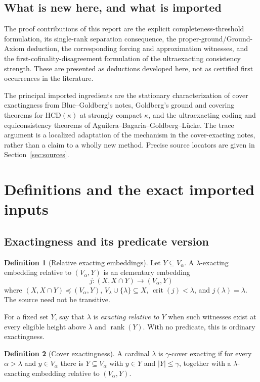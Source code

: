 \documentclass[11pt,letterpaper]{article}
\theoremstyle{definition}
\newtheorem{definition}{Definition}[section]
\newcommand{\crit}{\operatorname{crit}}
\newcommand{\rank}{\operatorname{rank}}
\newcommand{\HCD}{\mathrm{HCD}}
\begin{document}
\subsection{What is new here, and what is imported}

The proof contributions of this report are the explicit completeness-threshold formulation, its single-rank separation consequence, the proper-ground/Ground-Axiom deduction, the corresponding forcing and approximation witnesses, and the first-cofinality-disagreement formulation of the ultraexacting consistency strength. These are presented as deductions developed here, not as certified first occurrences in the literature.

The principal imported ingredients are the stationary characterization of cover exactingness from Blue--Goldberg's notes, Goldberg's ground and covering theorems for $\HCD(\kappa)$ at strongly compact $\kappa$, and the ultraexacting coding and equiconsistency theorems of Aguilera--Bagaria--Goldberg--L\"ucke. The trace argument is a localized adaptation of the mechanism in the cover-exacting notes, rather than a claim to a wholly new method. Precise source locators are given in Section~\ref{sec:sources}.

\section{Definitions and the exact imported inputs}\label{sec:background}

\subsection{Exactingness and its predicate version}

\begin{definition}[Relative exacting embeddings]
Let $Y\subseteq V_\alpha$. A $\lambda$-exacting embedding relative to $(V_\alpha,Y)$ is an elementary embedding
\[
 j:(X,X\cap Y)\longrightarrow(V_\alpha,Y)
\]
where $(X,X\cap Y)\preceq(V_\alpha,Y)$, $V_\lambda\cup\{\lambda\}\subseteq X$, $\crit(j)<\lambda$, and $j(\lambda)=\lambda$. The source need not be transitive.

For a fixed set $Y$, say that $\lambda$ is \emph{exacting relative to $Y$} when such witnesses exist at every eligible height above $\lambda$ and $\rank(Y)$. With no predicate, this is ordinary exactingness.
\end{definition}

\begin{definition}[Cover exactingness]
A cardinal $\lambda$ is $\gamma$-cover exacting if for every $\alpha>\lambda$ and $y\in V_\alpha$ there is $Y\subseteq V_\alpha$ with $y\in Y$ and $|Y|\leq\gamma$, together with a $\lambda$-exacting embedding relative to $(V_\alpha,Y)$.
\end{definition}
\end{document}
